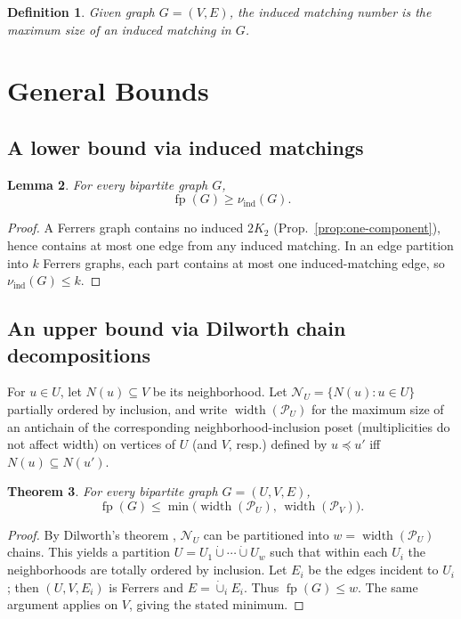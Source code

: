 \documentclass[12pt]{amsart}
\newtheorem{theorem}{Theorem}
\newtheorem{lemma}[theorem]{Lemma}
\newtheorem{definition}[theorem]{Definition}
\newcommand{\fp}{\operatorname{fp}}
\newcommand{\ind}{\operatorname{ind}}
\newcommand{\width}{\operatorname{width}}
\begin{document}
\begin{definition}
Given graph $G=(V,E)$, the \emph{induced matching number} is the maximum size of an induced matching in $G$.
\end{definition}


\section{General Bounds}
\label{sec:bounds}

\subsection{A lower bound via induced matchings}

\begin{lemma}
\label{lem:lower}
For every bipartite graph $G$,
\[
\fp(G) \ge \nu_{\ind}(G).
\]
\end{lemma}

\begin{proof}
A Ferrers graph contains no induced $2K_2$ (Prop.~\ref{prop:one-component}), hence contains at most one edge from any induced matching.
In an edge partition into $k$ Ferrers graphs, each part contains at most one induced-matching edge, so $\nu_{\ind}(G)\le k$.
\end{proof}

\subsection{An upper bound via Dilworth chain decompositions}

For $u\in U$, let $N(u)\subseteq V$ be its neighborhood.
Let $\mathcal{N}_U=\{N(u):u\in U\}$ partially ordered by inclusion, and write $\width(\mathcal P_U)$ for the maximum size of an antichain of the corresponding neighborhood-inclusion poset (multiplicities do not affect width) on vertices of $U$ (and $V$, resp.) defined by $u\preceq u'$ iff $N(u)\subseteq N(u')$.

\begin{theorem}
\label{thm:upper}
For every bipartite graph $G=(U,V,E)$,
\[
\fp(G) \le \min\big(\width(\mathcal P_U),\,\width(\mathcal P_V)\big).
\]
\end{theorem}

\begin{proof}
By Dilworth's theorem \cite{Dilworth1950}, $\mathcal{N}_U$ can be partitioned into $w=\width(\mathcal P_U)$ chains.
This yields a partition $U=U_1\dot\cup\cdots\dot\cup U_w$ such that within each $U_i$ the neighborhoods are totally ordered by inclusion.
Let $E_i$ be the edges incident to $U_i$; then $(U,V,E_i)$ is Ferrers and $E=\dot\cup_i E_i$.
Thus $\fp(G)\le w$.
The same argument applies on $V$, giving the stated minimum.
\end{proof}
\end{document}
